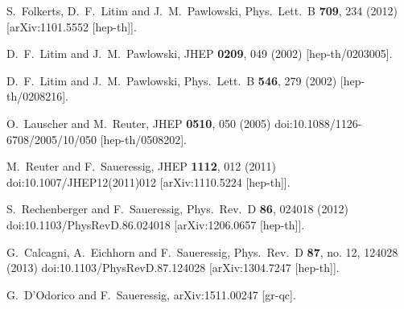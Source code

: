 \documentclass[twocolumn,prd,superscriptaddress,preprintnumbers,amsmath,amssymb,nofootinbib]{revtex4}
\begin{document}
\begin{thebibliography}{99}
  
  S.~Folkerts, D.~F.~Litim and J.~M.~Pawlowski,
  Phys.\ Lett.\ B {\bf 709}, 234 (2012)
  [arXiv:1101.5552 [hep-th]].
  
  D.~F.~Litim and J.~M.~Pawlowski,
  JHEP {\bf 0209}, 049 (2002)
  [hep-th/0203005].

  D.~F.~Litim and J.~M.~Pawlowski,
  Phys.\ Lett.\ B {\bf 546}, 279 (2002)
  [hep-th/0208216].
  

  

  O.~Lauscher and M.~Reuter,
  JHEP {\bf 0510}, 050 (2005)
  doi:10.1088/1126-6708/2005/10/050
  [hep-th/0508202].
  
  M.~Reuter and F.~Saueressig,
  JHEP {\bf 1112}, 012 (2011)
  doi:10.1007/JHEP12(2011)012
  [arXiv:1110.5224 [hep-th]].
  
  S.~Rechenberger and F.~Saueressig,
  Phys.\ Rev.\ D {\bf 86}, 024018 (2012)
  doi:10.1103/PhysRevD.86.024018
  [arXiv:1206.0657 [hep-th]].
  
  G.~Calcagni, A.~Eichhorn and F.~Saueressig,
  Phys.\ Rev.\ D {\bf 87}, no. 12, 124028 (2013)
  doi:10.1103/PhysRevD.87.124028
  [arXiv:1304.7247 [hep-th]].
  
  
  G.~D'Odorico and F.~Saueressig,
  arXiv:1511.00247 [gr-qc].
\end{thebibliography}
\end{document}
